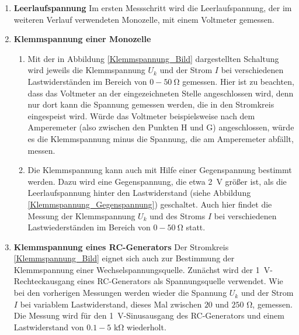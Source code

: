\begin{enumerate}
\item \textbf{Leerlaufspannung} Im ersten Messschritt wird die Leerlaufspannung, der im weiteren Verlauf verwendeten Monozelle, mit einem Voltmeter gemessen.
\item \textbf{Klemmspannung einer Monozelle}
\begin{enumerate}[label=\alph*)]
	\item Mit der in Abbildung \ref{Klemmspannung_Bild} dargestellten Schaltung wird jeweils die Klemmspannung $U_k$ und der Strom $I$ bei verschiedenen Lastwiderständen im Bereich von $0-50\ \si{\ohm}$ gemessen. Hier ist zu beachten, dass das Voltmeter an der eingezeichneten Stelle angeschlossen wird, denn nur dort kann die Spannung gemessen werden, die in den Stromkreis eingespeist wird. Würde das Voltmeter beispielsweise nach dem Amperemeter (also zwischen den Punkten H und G) angeschlossen, würde es die Klemmspannung minus die Spannung, die am Amperemeter abfällt, messen.
	\item Die Klemmspannung kann auch mit Hilfe einer Gegenspannung bestimmt werden. Dazu wird eine Gegenspannung, die etwa \SI{2}{\volt} größer ist, als die Leerlaufspannung hinter den Lastwiderstand (siehe Abbildung \ref{Klemmspannung_Gegenspannung}) geschaltet. Auch hier findet die Messung der Klemmspannung $U_k$ und des Stroms $I$ bei verschiedenen Lastwiederständen im Bereich von $0-50\ \si{\ohm}$ statt.
\end{enumerate}

\item \textbf{Klemmspannung eines RC-Generators} Der Stromkreis \ref{Klemmspannung_Bild} eignet sich auch zur Bestimmung der Klemmspannung einer Wechselspannungsquelle. Zunächst wird der \SI{1}{\volt}-Rechteckausgang eines RC-Generators als Spannungsquelle verwendet. Wie bei den vorherigen Messungen werden wieder die Spannung $U_k$ und der Strom $I$ bei variablem Lastwiderstand, dieses Mal zwischen $20$ und $250$ \si{\ohm}, gemessen. Die Messung wird für den \SI{1}{\volt}-Sinusausgang des RC-Generators und einem Lastwiderstand von $0.1-5$ \si{\kilo\ohm} wiederholt.
\end{enumerate}
